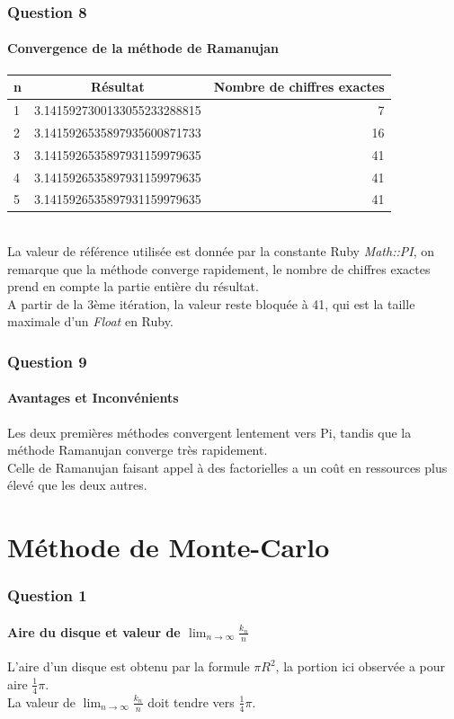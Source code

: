 \documentclass[a4paper,10pt]{report}
\begin{document}
\subsection{Question 8}
\subsubsection{Convergence de la méthode de Ramanujan}
\begin{tabular}{|l|c|r|} 
	\hline
	n & Résultat & Nombre de chiffres exactes\\
  	\hline
	1 & 3.1415927300133055233288815 & 7\\
	\hline
	2 & 3.1415926535897935600871733 & 16\\
	\hline
	3 & 3.1415926535897931159979635 & 41\\
	\hline
	4 & 3.1415926535897931159979635 & 41\\
	\hline
	5 & 3.1415926535897931159979635 & 41\\	
	\hline	
\end{tabular}\\
La valeur de référence utilisée est donnée par la constante Ruby \textit{Math::PI}, on remarque que la méthode converge rapidement, le nombre de chiffres exactes prend en compte la partie entière du résultat.\\
A partir de la 3ème itération, la valeur reste bloquée à 41, qui est la taille maximale d'un \textit{Float} en Ruby.
\bigskip

\subsection{Question 9}
\subsubsection{Avantages et Inconvénients}
Les deux premières méthodes convergent lentement vers Pi, tandis que la méthode Ramanujan converge très rapidement.\\
Celle de Ramanujan faisant appel à des factorielles a un coût en ressources plus élevé que les deux autres.

\chapter{Méthode de Monte-Carlo}
\subsection{Question 1}
\subsubsection{Aire du disque et valeur de $\lim_{n\to\infty} \frac{k_n}{n}$}
L'aire d'un disque est obtenu par la formule $\pi R^2$, la portion ici observée a pour aire $\frac{1}{4}\pi$.\\
La valeur de $\lim_{n\to\infty} \frac{k_n}{n}$ doit tendre vers $\frac{1}{4}\pi$.
\bigskip
\end{document}
